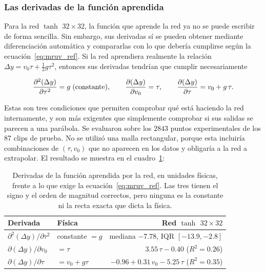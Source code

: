 \documentclass[titlepage,11pt]{article}
\providecommand{\num}[1]{\ensuremath{#1}}
\begin{document}
\subsubsection{Las derivadas de la función aprendida}

Para la red $\tanh$ $32\times32$, la función que aprende la red ya no se puede escribir de forma sencilla. Sin embargo, sus derivadas sí se pueden obtener mediante diferenciación automática y compararlas con lo que debería cumplirse según la ecuación~\eqref{eq:mruv_ref}. Si la red aprendiera realmente la relación $\Delta y = v_0\tau + \tfrac{1}{2}g\tau^2$, entonces sus derivadas tendrían que cumplir necesariamente

\begin{equation}
	\pdv[2]{(\Delta y)}{\tau} = g \;\text{(constante)}, \qquad
	\pdv{(\Delta y)}{v_0} = \tau, \qquad
	\pdv{(\Delta y)}{\tau} = v_0 + g\,\tau .
	\label{eq:predicciones_derivadas}
\end{equation}

Estas son tres condiciones que permiten comprobar qué está haciendo la red internamente, y son más exigentes que simplemente comprobar si sus salidas se parecen a una parábola. Se evaluaron sobre los \num{2843} puntos experimentales de los 87 clips de prueba. No se utilizó una malla rectangular, porque esta incluiría combinaciones de $(\tau,v_0)$ que no aparecen en los datos y obligaría a la red a extrapolar. El resultado se muestra en el cuadro~\ref{tab:derivadas}:

\begin{table}
  \centering
  \begin{tabular}{llr}
    \toprule
    Derivada & Física & Red $\tanh$ $32\times32$ \\
    \midrule
    $\partial^2(\Delta y)/\partial\tau^2$ & constante $=g$
      & mediana $-7.78$, IQR $[-13.9, -2.8]$ \\
    $\partial(\Delta y)/\partial v_0$ & $=\tau$
      & $3.55\,\tau - 0.40$ \quad ($R^2=0.26$) \\
    $\partial(\Delta y)/\partial\tau$ & $=v_0+g\tau$
      & $-0.96 + 0.31\,v_0 - 5.25\,\tau$ \quad ($R^2=0.35$) \\
    \bottomrule
  \end{tabular}
  \caption{Derivadas de la función aprendida por la red, en unidades físicas,
    frente a lo que exige la ecuación~\eqref{eq:mruv_ref}. Las tres tienen el
    signo y el orden de magnitud correctos, pero ninguna es la constante ni la
    recta exacta que dicta la física.}
  \label{tab:derivadas}
\end{table}
\end{document}
